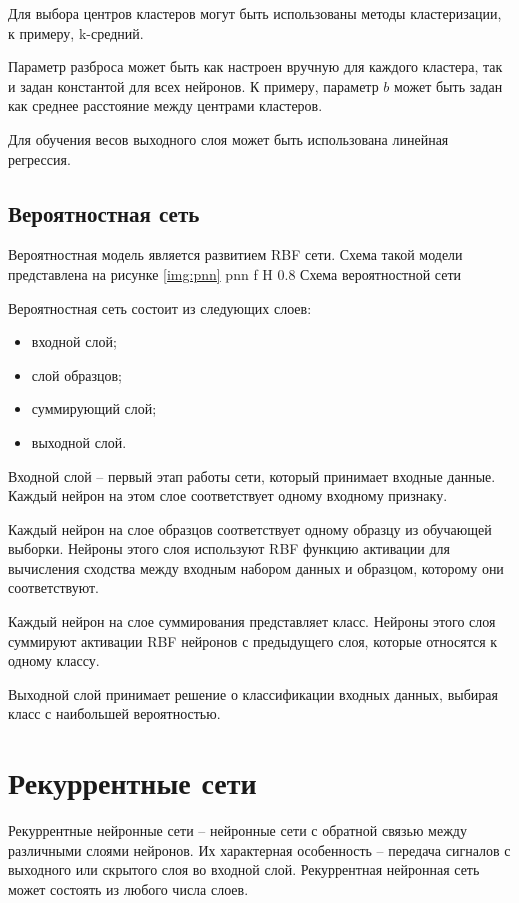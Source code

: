 Для выбора центров кластеров могут быть использованы методы кластеризации, к примеру, k-средний.

Параметр разброса может быть как настроен вручную для каждого кластера, так и задан константой для всех нейронов.
К примеру, параметр $b$ может быть задан как среднее расстояние между центрами кластеров.

Для обучения весов выходного слоя может быть использована линейная регрессия.

\subsection{Вероятностная сеть}
Вероятностная модель является развитием RBF сети. Схема такой модели представлена на рисунке \ref{img:pnn}
{pnn} %
{f} %
{H} %
{0.8\textwidth} %
{Схема вероятностной сети} %

Вероятностная сеть состоит из следующих слоев:
\begin{itemize}
	\item входной слой;
	\item слой образцов;
	\item суммирующий слой;
	\item выходной слой.
\end{itemize}

Входной слой -- первый этап работы сети, который принимает входные данные.
Каждый нейрон на этом слое соответствует одному входному признаку.

Каждый нейрон на слое образцов соответствует одному образцу из обучающей выборки.
Нейроны этого слоя используют RBF функцию активации для вычисления сходства между входным набором данных и образцом, которому они соответствуют.

Каждый нейрон на слое суммирования представляет класс.
Нейроны этого слоя суммируют активации RBF нейронов с предыдущего слоя, которые относятся к одному классу.

Выходной слой принимает решение о классификации входных данных, выбирая класс с наибольшей вероятностью.

\section{Рекуррентные сети}
Рекуррентные нейронные сети -- нейронные сети с обратной связью между различными слоями нейронов.
Их характерная особенность -- передача сигналов с выходного или скрытого слоя во входной слой.
Рекуррентная нейронная сеть может состоять из любого числа слоев.

